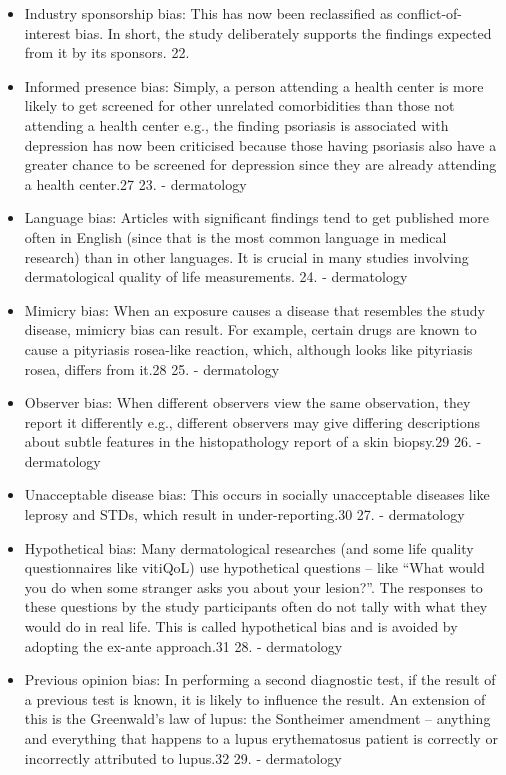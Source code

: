 \documentclass[12pt, a4paper, oneside]{book}   	%
\begin{document}
\begin{itemize}
				\item  Industry sponsorship bias: This has now been reclassified as conflict-of-interest bias. In short, the study deliberately supports the findings expected from it by its sponsors. 22.\autocite{Chakraborty_2023}
				\item  Informed presence bias: Simply, a person attending a health center is more likely to get screened for other unrelated comorbidities than those not attending a health center e.g., the finding psoriasis is associated with depression has now been criticised because those having psoriasis also have a greater chance to be screened for depression since they are already attending a health center.27 23. \autocite{Chakraborty_2023} - dermatology
				\item Language bias: Articles with significant findings tend to get published more often in English (since that is the most common language in medical research) than in other languages. It is crucial in many studies involving dermatological quality of life measurements. 24.\autocite{Chakraborty_2023} - dermatology
				\item  Mimicry bias: When an exposure causes a disease that resembles the study disease, mimicry bias can result. For example, certain drugs are known to cause a pityriasis rosea-like reaction, which, although looks like pityriasis rosea, differs from it.28 25.\autocite{Chakraborty_2023} - dermatology
				\item  Observer bias: When different observers view the same observation, they report it differently e.g., different observers may give differing descriptions about subtle features in the histopathology report of a skin biopsy.29 26. \autocite{Chakraborty_2023} - dermatology
				\item Unacceptable disease bias: This occurs in socially unacceptable diseases like leprosy and STDs, which result in under-reporting.30 27. \autocite{Chakraborty_2023} - dermatology
				\item Hypothetical bias: Many dermatological researches (and some life quality questionnaires like vitiQoL) use hypothetical questions – like “What would you do when some stranger asks you about your lesion?”. The responses to these questions by the study participants often do not tally with what they would do in real life. This is called hypothetical bias and is avoided by adopting the ex-ante approach.31 28.
				\autocite{Chakraborty_2023} - dermatology
				\item  Previous opinion bias: In performing a second diagnostic test, if the result of a previous test is known, it is likely to influence the result. An extension of this is the Greenwald’s law of lupus: the Sontheimer amendment – anything and everything that happens to a lupus erythematosus patient is correctly or incorrectly attributed to lupus.32 29. \autocite{Chakraborty_2023} - dermatology
		

\end{itemize}
\end{document}
